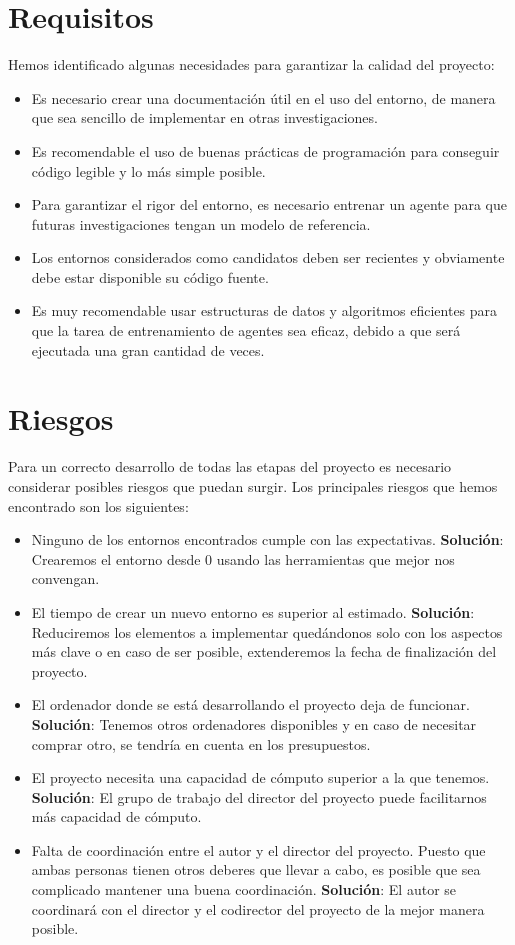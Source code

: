  \section{Requisitos}

Hemos identificado algunas necesidades para garantizar la calidad del proyecto:
\begin{itemize}
    \item Es necesario crear una documentación útil en el uso del entorno, de manera que sea sencillo de implementar en otras investigaciones.
    \item Es recomendable el uso de buenas prácticas de programación para conseguir código legible y lo más simple posible. 
    \item Para garantizar el rigor del entorno, es necesario entrenar un agente para que futuras investigaciones tengan un modelo de referencia.
    \item Los entornos considerados como candidatos deben ser recientes y obviamente debe estar disponible su código fuente. 
    \item Es muy recomendable usar estructuras de datos y algoritmos eficientes para que la tarea de entrenamiento de agentes sea eficaz, debido a que será ejecutada una gran cantidad de veces.
\end{itemize}


\section{Riesgos}
Para un correcto desarrollo de todas las etapas del proyecto es necesario considerar posibles riesgos que puedan surgir. Los principales riesgos que hemos encontrado son los siguientes:
\begin{itemize}
    \item Ninguno de los entornos encontrados cumple con las expectativas. \textbf{Solución}: Crearemos el entorno desde 0 usando las herramientas que mejor nos convengan.
    \item El tiempo de crear un nuevo entorno es superior al estimado. \textbf{Solución}: Reduciremos los elementos a implementar quedándonos solo con los aspectos más clave o en caso de ser posible, extenderemos la fecha de finalización del proyecto.
    \item El ordenador donde se está desarrollando el proyecto deja de funcionar. \textbf{Solución}: Tenemos otros ordenadores disponibles y en caso de necesitar comprar otro, se tendría en cuenta en los presupuestos. 
    \item El proyecto necesita una capacidad de cómputo superior a la que tenemos. \textbf{Solución}: El grupo de trabajo del director del proyecto puede facilitarnos más capacidad de cómputo.
    \item Falta de coordinación entre el autor y el director del proyecto. Puesto que ambas personas tienen otros deberes que llevar a cabo, es posible que sea complicado mantener una buena coordinación. \textbf{Solución}: El autor se coordinará con el director y el codirector del proyecto de la mejor manera posible. 
\end{itemize}
    